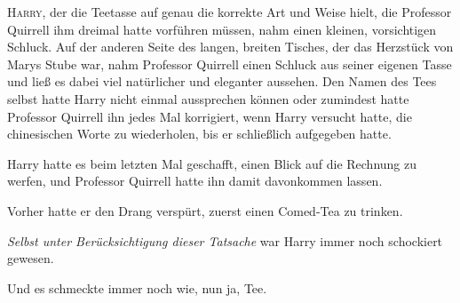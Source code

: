 
\lettrine{H}{arry}, der die Teetasse auf genau die korrekte Art und Weise hielt, die Professor Quirrell ihm dreimal hatte vorführen müssen, nahm einen kleinen, vorsichtigen Schluck. Auf der anderen Seite des langen, breiten Tisches, der das Herzstück von Marys Stube war, nahm Professor Quirrell einen Schluck aus seiner eigenen Tasse und ließ es dabei viel natürlicher und eleganter aussehen. Den Namen des Tees selbst hatte Harry nicht einmal aussprechen können oder zumindest hatte Professor Quirrell ihn jedes Mal korrigiert, wenn Harry versucht hatte, die chinesischen Worte zu wiederholen, bis er schließlich aufgegeben hatte.

Harry hatte es beim letzten Mal geschafft, einen Blick auf die Rechnung zu werfen, und Professor Quirrell hatte ihn damit davonkommen lassen.

Vorher hatte er den Drang verspürt, zuerst einen Comed-Tea zu trinken.

\emph{Selbst unter Berücksichtigung dieser Tatsache} war Harry immer noch schockiert gewesen.

Und es schmeckte immer noch wie, nun ja, Tee.

